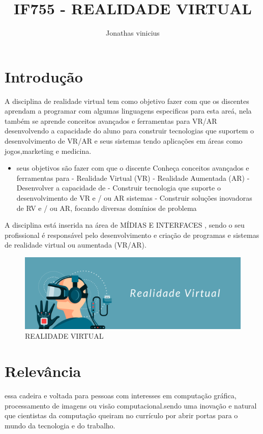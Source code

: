 \documentclass[10pt]{article}
\title{IF755 - REALIDADE VIRTUAL}
\author{Jonathas vinicius }
\date{\vspace{-5ex}}
\begin{document}
\maketitle

\section{Introdução}

A disciplina de realidade virtual tem como objetivo fazer com que os discentes aprendam a programar com algumas linguagens especificas para esta areá, nela também se aprende conceitos avançados e ferramentas para VR/AR desenvolvendo a capacidade do aluno para construir tecnologias que suportem o desenvolvimento de VR/AR e seus sistemas tendo aplicações em áreas como jogos,marketing e medicina.

\begin{itemize}
  \item seus objetivos são fazer com que o discente Conheça conceitos avançados e ferramentas para
- Realidade Virtual (VR)
- Realidade Aumentada (AR)
- Desenvolver a capacidade de
- Construir tecnologia que suporte o desenvolvimento de VR e / ou AR
sistemas
- Construir soluções inovadoras de RV e / ou AR, focando diversas
domínios de problema 
\end{itemize}

A disciplina está inserida na área de MÍDIAS E INTERFACES , sendo o seu profissional é responsável pelo desenvolvimento e criação de programas e sistemas de realidade virtual ou aumentada (VR/AR).

\begin{figure}[]
    \centering
    \includegraphics[scale=0.15]{realidadevirtual.png}
    \caption{REALIDADE VIRTUAL}
    \label{fig:realidadevirtual}
\end{figure}

\section{Relevância}
essa cadeira e voltada para pessoas com interesses em computação gráfica, processamento de imagens ou visão computacional.sendo uma inovação e natural que cientistas da computação queiram no currículo por abrir portas para o mundo da tecnologia e do trabalho.
\end{document}
